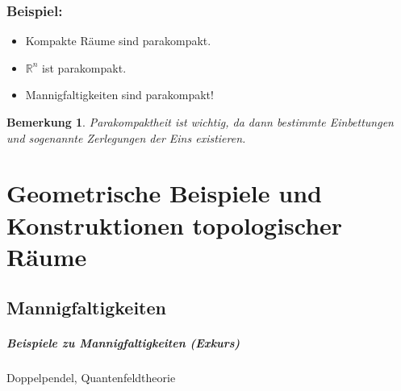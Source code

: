 \documentclass[a4paper,11pt,notitlepage]{report}
\newtheorem{remark}{Bemerkung}[chapter]
\newcommand{\R}{{\ensuremath{\mathbb{R}}}}
\newenvironment{bsp}[1]
{
\setlength{\fboxsep}{10pt}
\subsection*{Beispiel: #1}
\begin{upshape}
}
{
\end{upshape}
}
\begin{document}
\begin{bsp}{}
	 \begin{itemize}
	 	\item Kompakte Räume sind parakompakt.
	 	\item $\R^n$ ist parakompakt.
	 	\item Mannigfaltigkeiten sind parakompakt!
	 \end{itemize}
\end{bsp}

\begin{remark}{}
	Parakompaktheit ist wichtig, da dann bestimmte Einbettungen und sogenannte Zerlegungen der Eins existieren.
\end{remark}

\chapter{Geometrische Beispiele und Konstruktionen topologischer Räume}
\section{Mannigfaltigkeiten}

\paragraph{Beispiele zu Mannigfaltigkeiten (Exkurs)} Doppelpendel, Quantenfeldtheorie
\end{document}
